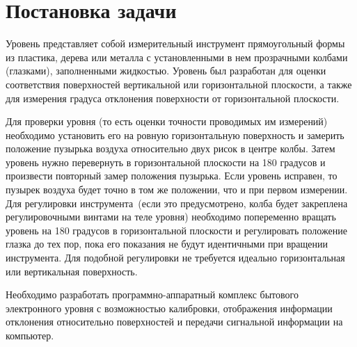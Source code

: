 \documentclass[document.tex]{subfiles}
\begin{document}
\section{Постановка задачи}
Уровень представляет собой измерительный инструмент прямоугольный формы из
пла\-стика, дерева или металла с установленными в нем прозрачными колбами
(глазками), запол\-ненными жидкостью. Уровень был разработан для оценки
соответствия поверхностей верти\-кальной или горизонтальной плоскости, а также
для измерения градуса отклонения поверх\-ности от горизонтальной плоскости.

Для проверки уровня (то есть оценки точности проводимых им измерений) необходимо
установить его на ровную горизонтальную поверхность и замерить положение
пузырька воздуха относительно двух рисок в центре колбы. Затем уровень нужно
перевернуть в горизонтальной плоскости на 180 градусов и произвести повторный
замер положения пузырька. Если уровень исправен, то пузырек воздуха будет точно
в том же положении, что и при первом измерении. Для регулировки
инструмента~(если это предусмотрено, колба будет закреплена регулировочными
винтами на теле уровня) необходимо попеременно вращать уровень на 180 градусов в
горизонтальной плоскости и регулировать положение глазка до тех пор, пока его
показания не будут идентичными при вращении инструмента. Для подобной
регулировки не требуется идеально горизонтальная или вертикальная
поверхность.\cite{spiritlevel_info}

Необходимо разработать программно-аппаратный комплекс бытового электронного
уровня с возможностью калибровки, отображения информации отклонения относительно
поверхностей и передачи сигнальной информации на компьютер.
\end{document}
